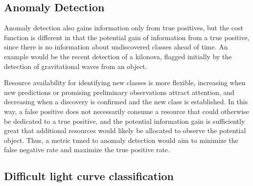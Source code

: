 \subsection{Anomaly Detection}
\label{sec:anom}
Anomaly detection also gains information only from true positives, but the cost function is different in that the potential gain of information from a true positive, since there is no information about undiscovered classes ahead of time.
An example would be the recent detection of a kilonova, flagged initially by the detection of gravitational waves from an object.

Resource availability for identifying new classes is more flexible, increasing when new predictions or promising preliminary observations attract attention, and decreasing when a discovery is confirmed and the new class is established.
In this way, a false positive does not necessarily consume a resource that could otherwise be dedicated to a true positive, and the potential information gain is sufficiently great that additional resources would likely be allocated to observe the potential object.
Thus, a metric tuned to anomaly detection would aim to minimize the false negative rate and maximize the true positive rate.

%

\subsection{Difficult light curve classification}
\label{sec:difficult}

